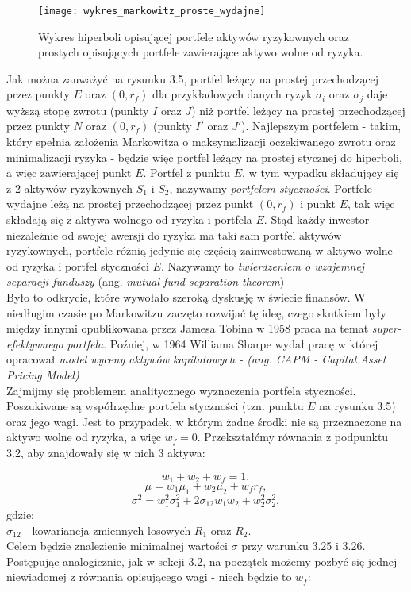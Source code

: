 \documentclass[magister]{dyplom}
\begin{document}
\begin{figure}[h]
	\centering
	\texttt{[image: wykres\_markowitz\_proste\_wydajne]}
	\caption{Wykres hiperboli opisującej portfele aktywów ryzykownych oraz prostych opisujących portfele zawierające aktywo wolne od ryzyka.}
\end{figure}

Jak można zauważyć na rysunku 3.5, portfel leżący na prostej przechodzącej przez punkty $E$ oraz $(0, r_f)$ dla przykładowych danych ryzyk $\sigma_i$ oraz $\sigma_j$ daje wyższą stopę zwrotu (punkty $I$ oraz $J$) niż portfel leżący na prostej przechodzącej przez punkty $N$ oraz $(0, r_f)$ (punkty $I'$ oraz $J'$). Najlepszym portfelem - takim, który spełnia założenia Markowitza o maksymalizacji oczekiwanego zwrotu oraz minimalizacji ryzyka - będzie więc portfel leżący na prostej stycznej do hiperboli, a więc zawierającej punkt $E$. Portfel z punktu $E$, w tym wypadku składujący się z 2 aktywów ryzykownych $S_1$ i $S_2$, nazywamy \textit{portfelem styczności}. Portfele wydajne leżą na prostej przechodzącej przez punkt $(0,r_f)$ i punkt $E$, tak więc składają się z aktywa wolnego od ryzyka i portfela $E$. Stąd każdy inwestor niezależnie od swojej awersji do ryzyka ma taki sam portfel aktywów ryzykownych, portfele różnią jedynie się częścią zainwestowaną w aktywo wolne od ryzyka i portfel styczności $E$. Nazywamy to \textit{twierdzeniem o wzajemnej separacji funduszy} (ang. \textit{mutual fund separation theorem})\\ 

Było to odkrycie, które wywołało szeroką dyskusję w świecie finansów. W niedługim czasie po Markowitzu zaczęto rozwijać tę ideę, czego skutkiem były między innymi opublikowana przez Jamesa Tobina w 1958 praca na temat \textit{super-efektywnego portfela}. Poźniej, w 1964 Williama Sharpe wydał pracę w której opracował \textit{model wyceny aktywów kapitałowych - (ang. CAPM - Capital Asset Pricing Model)}\cite{holton}\\

Zajmijmy się problemem analitycznego wyznaczenia portfela styczności. Poszukiwane są współrzędne portfela styczności (tzn. punktu $E$ na rysunku 3.5) oraz jego wagi. Jest to przypadek, w którym żadne środki nie są przeznaczone na aktywo wolne od ryzyka, a więc $w_f = 0$. Przekształćmy równania z podpunktu 3.2, aby znajdowały się w nich 3 aktywa: 

\begin{equation}
	w_1 + w_2 + w_f = 1,
\end{equation}
\begin{equation}
	\mu = w_1\mu_1 + w_2\mu_2 + w_fr_f,
\end{equation}
\begin{equation}
	\sigma^2 = w_1^2\sigma_1^2 + 2\sigma_{12}w_1w_2 + w_2^2\sigma_2^2,
\end{equation}
gdzie:\\
$\sigma_{12}$ - kowariancja zmiennych losowych $R_1$ oraz $R_2$.\\
Celem będzie znalezienie minimalnej wartości $\sigma$ przy warunku 3.25 i 3.26. Postępując analogicznie, jak w sekcji 3.2, na początek możemy pozbyć się jednej niewiadomej z równania opisującego wagi - niech będzie to $w_f$:
\end{document}
